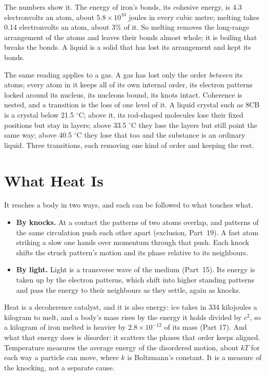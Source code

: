 \documentclass[11pt,a4paper]{article}
\begin{document}
 The numbers show it. The energy of iron's bonds, its cohesive energy, is 4.3 electronvolts an atom, about $5.8\times10^{10}$ joules in every cubic metre; melting takes 0.14 electronvolts an atom, about 3\% of it. So melting removes the long-range arrangement of the atoms and leaves their bonds almost whole; it is boiling that breaks the bonds. A liquid is a solid that has lost its arrangement and kept its bonds.

The same reading applies to a gas. A gas has lost only the order \emph{between} its atoms; every atom in it keeps all of its own internal order, its electron patterns locked around its nucleus, its nucleons bound, its knots intact. Coherence is nested, and a transition is the loss of one level of it.  A liquid crystal such as 8CB is a crystal below 21.5 $^\circ$C; above it, its rod-shaped molecules lose their fixed positions but stay in layers; above 33.5 $^\circ$C they lose the layers but still point the same way; above 40.5 $^\circ$C they lose that too and the substance is an ordinary liquid. Three transitions, each removing one kind of order and keeping the rest.

\section{What Heat Is}
\label{sec:heat}

 It reaches a body in two ways, and each can be followed to what touches what.
\begin{itemize}
\item \textbf{By knocks.} At a contact the patterns of two atoms overlap, and patterns of the same circulation push each other apart (exclusion, Part~19). A fast atom striking a slow one hands over momentum through that push. Each knock shifts the struck pattern's motion and its phase relative to its neighbours.
\item \textbf{By light.} Light is a transverse wave of the medium (Part~15). Its energy is taken up by the electron patterns, which shift into higher standing patterns and pass the energy to their neighbours as they settle, again as knocks.
\end{itemize}

 Heat is a decoherence catalyst, and it is also energy: ice takes in 334 kilojoules a kilogram to melt, and a body's mass rises by the energy it holds divided by $c^2$, so a kilogram of iron melted is heavier by $2.8\times10^{-12}$ of its mass (Part 17). And what that energy does is disorder: it scatters the phases that order keeps aligned.  Temperature measures the average energy of the disordered motion, about $kT$ for each way a particle can move, where $k$ is Boltzmann's constant. It is a measure of the knocking, not a separate cause.
\end{document}
